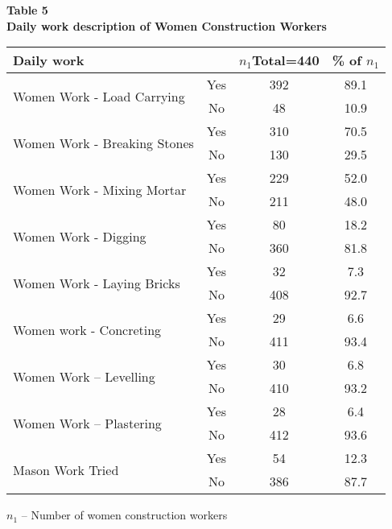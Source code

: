 \documentclass[12pt]{report}
\newcommand{\bt}[1]{\textbf{#1}}
\newcommand{\NI}{\noindent}
\begin{document}
	\NI\bt{Table 5}\\
	\bt{Daily work description of Women Construction Workers}
	\begin{longtable}{p{}@{\hskip 0.1in}c@{\hskip 0.2in}c@{\hskip 0.2in}c@{\hskip 0.2in}}
		\hline
		\bt{Daily work} & & $n_1${\footnotesize Total=440} & {\footnotesize\% of }$n_1$\\ \hline
		\multirow{2}{=}{Women Work - Load Carrying} & Yes & 392 & 89.1 \\
		& No & 48 & 10.9 \\ \hline
		\multirow{2}{=}{Women Work - Breaking Stones} & Yes & 310 & 70.5 \\
		& No & 130 &  29.5 \\ \hline
		\multirow{2}{=}{Women Work - Mixing Mortar} & Yes &  229 & 52.0 \\
		& No & 211 & 48.0 \\ \hline
		\multirow{2}{=}{Women Work - Digging} & Yes & 80 & 18.2 \\
		& No & 360 & 81.8 \\ \hline
		\multirow{2}{=}{Women Work - Laying Bricks} & Yes & 32 & 7.3 \\
		& No & 408 & 92.7 \\ \hline
		\multirow{2}{=}{Women work - Concreting} & Yes & 29 & 6.6 \\
		& No & 411 & 93.4 \\ \hline
		\multirow{2}{=}{Women Work – Levelling} & Yes & 30 & 6.8 \\
		& No & 410 & 93.2 \\ \hline
		\multirow{2}{=}{Women Work – Plastering} & Yes & 28 & 6.4 \\
		& No & 412 & 93.6 \\ \hline
		\multirow{2}{=}{Mason Work Tried} & Yes & 54 & 12.3 \\
		& No & 386 & 87.7 \\ \hline
	\end{longtable}
	$n_1$ – Number of women construction workers\\
\end{document}
